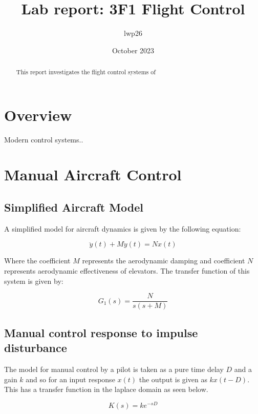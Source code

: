 \documentclass[8pt]{article}
\begin{document}

\title{Lab report: 3F1 Flight Control}
\author{lwp26}
\date{October 2023}
\maketitle

\begin{abstract}
    \centering
    This report investigates the flight control systems of 
\end{abstract}

\newpage

\section{Overview}



Modern control systems..

\section{Manual Aircraft Control}

\subsection{Simplified Aircraft Model}

A simplified model for aircraft dynamics is given by the following equation:

\[
 \ddot{y}(t) + M\dot{y}(t) = Nx(t)
\]

Where the coefficient $M$ represents the aerodynamic damping and coefficient $N$ represents aerodynamic effectiveness of elevators.
The transfer function of this system is given by:

\begin{equation}
    G_1(s) = \frac{N}{s(s + M)}
\end{equation}

\subsection{Manual control response to impulse disturbance}

The model for manual control by a pilot is taken as a pure time delay $D$ and a gain $k$ and so for an input response $x(t)$ the output is given as $kx(t-D)$. This has a transfer function in the laplace domain as seen below.

\begin{equation}
    K(s) = ke^{-sD}
\end{equation}
\end{document}
